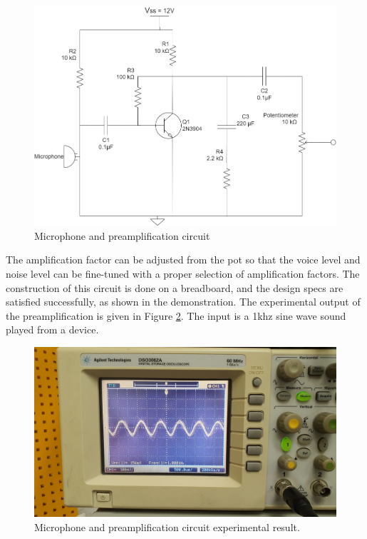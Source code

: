 \documentclass[a4paper,10pt]{IEEEtran}
\begin{document}
\begin{figure}[htbp!]
    \centering
    \includegraphics[width = 1\linewidth]{Preamplifier.drawio.png}
    \caption{Microphone and preamplification circuit}
    \label{PreAmp}
\end{figure} 
The amplification factor can be adjusted from the pot so that the voice level and noise level can be fine-tuned with a proper selection of amplification factors. The construction of this circuit is done on a breadboard, and the design specs are satisfied successfully, as shown in the demonstration. The experimental output of the preamplification is given in Figure \ref{preamp_osc}. The input is a 1khz sine wave sound played from a device.
\begin{figure}[htbp!]
    \centering
    \includegraphics[width = 1\linewidth]{preamp_experimental.jpeg}
    \caption{Microphone and preamplification circuit experimental result.}
    \label{preamp_osc}
\end{figure} 
\end{document}
